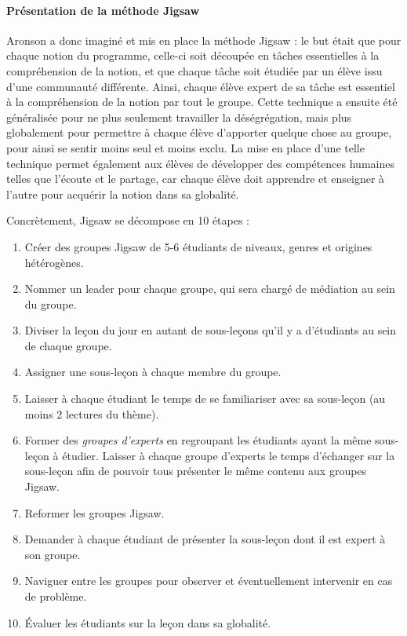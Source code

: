 \paragraph{Présentation de la méthode Jigsaw}
Aronson a donc imaginé et mis en place la méthode Jigsaw : le but était que pour chaque notion du programme, celle-ci soit découpée en tâches essentielles à la compréhension de la notion, et que chaque tâche soit étudiée par un élève issu d'une communauté différente. Ainsi, chaque élève \og expert \fg{} de sa tâche est essentiel à la compréhension de la notion par tout le groupe. Cette technique a ensuite été généralisée pour ne plus seulement travailler la déségrégation, mais plus globalement pour permettre à chaque élève d'apporter quelque chose au groupe, pour ainsi se sentir moins seul et moins exclu. La mise en place d'une telle technique permet également aux élèves de développer des compétences humaines telles que l'écoute et le partage, car chaque élève doit apprendre et enseigner à l'autre pour acquérir la notion dans sa globalité.

Concrètement, Jigsaw se décompose en 10 étapes :
\begin{enumerate}
	\item Créer des groupes Jigsaw de 5-6 étudiants de niveaux, genres et origines hétérogènes.
	\item Nommer un leader pour chaque groupe, qui sera chargé de médiation au sein du groupe.
	\item Diviser la leçon du jour en autant de sous-leçons qu'il y a d'étudiants au sein de chaque groupe.
	\item Assigner une sous-leçon à chaque membre du groupe.
	\item Laisser à chaque étudiant le temps de se familiariser avec sa sous-leçon (au moins 2 lectures du thème).\label{Familiarisation}
	\item Former des \emph{groupes d'experts} en regroupant les étudiants ayant la même sous-leçon à étudier. Laisser à chaque groupe d'experts le temps d'échanger sur la sous-leçon afin de pouvoir tous présenter le même contenu aux groupes Jigsaw.
	\item Reformer les groupes Jigsaw.
	\item Demander à chaque étudiant de présenter la sous-leçon dont il est expert à son groupe.\label{PrésentationSousLecon}
	\item Naviguer entre les groupes pour observer et éventuellement intervenir en cas de problème.
	\item Évaluer les étudiants sur la leçon dans sa globalité.
\end{enumerate}

